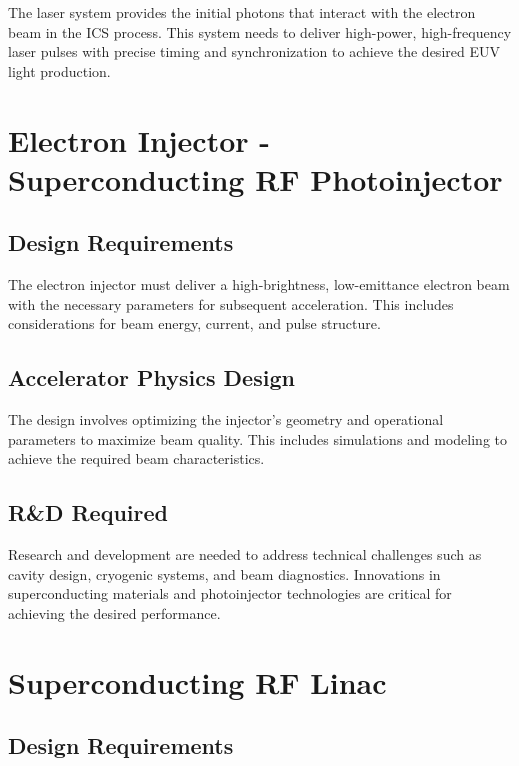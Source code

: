 \documentclass[10pt]{article}
\newcommand{\blankline}{\quad\pagebreak[3]}
\begin{document}
  The laser system provides the initial photons that interact with the electron beam in the ICS process. This system needs to deliver high-power, high-frequency laser pulses with precise timing and synchronization to achieve the desired EUV light production.
  
\blankline
\blankline
  
\section{Electron Injector - Superconducting RF Photoinjector}

  \subsection{Design Requirements}
  
  The electron injector must deliver a high-brightness, low-emittance electron beam with the necessary parameters for subsequent acceleration. This includes considerations for beam energy, current, and pulse structure.
  
  
  \subsection{Accelerator Physics Design}
  
  The design involves optimizing the injector's geometry and operational parameters to maximize beam quality. This includes simulations and modeling to achieve the required beam characteristics.
  
  
  \subsection{R\&D Required}  
  
  Research and development are needed to address technical challenges such as cavity design, cryogenic systems, and beam diagnostics. Innovations in superconducting materials and photoinjector technologies are critical for achieving the desired performance.
  

\blankline
\blankline

\section{Superconducting RF Linac}

  \subsection{Design Requirements}
  
\end{document}
